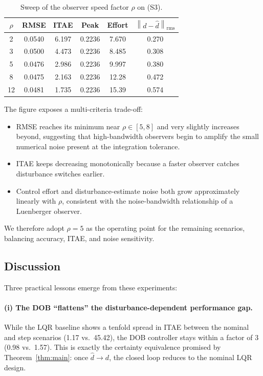 \documentclass[conference]{IEEEtran}
\newcommand{\norm}[1]{\left\lVert#1\right\rVert}
\begin{document}
\begin{table}[t]
  \centering
  \caption{Sweep of the observer speed factor $\rho$ on (S3).}
  \label{tab:sweep}
  \begin{tabular}{cccccc}
    \toprule
    $\rho$ & RMSE & ITAE & Peak & Effort & $\norm{\!d-\hat d\!}_{\!\mathrm{rms}}$\\
    \midrule
    2  & 0.0540 & 6.197 & 0.2236 & 7.670  & 0.270\\
    3  & 0.0500 & 4.473 & 0.2236 & 8.485  & 0.308\\
    5  & 0.0476 & 2.986 & 0.2236 & 9.997  & 0.380\\
    8  & 0.0475 & 2.163 & 0.2236 & 12.28  & 0.472\\
    12 & 0.0481 & 1.735 & 0.2236 & 15.39  & 0.574\\
    \bottomrule
  \end{tabular}
\end{table}

The figure exposes a multi-criteria trade-off:
\begin{itemize}\setlength\itemsep{2pt}
\item RMSE reaches its minimum near $\rho\!\in\![5,8]$ and very slightly
increases beyond, suggesting that high-bandwidth observers begin to amplify
the small numerical noise present at the integration tolerance.
\item ITAE keeps decreasing monotonically because a faster observer
catches disturbance switches earlier.
\item Control effort and disturbance-estimate noise both grow
approximately linearly with $\rho$, consistent with the noise-bandwidth
relationship of a Luenberger observer.
\end{itemize}

We therefore adopt $\rho=5$ as the operating point for the remaining
scenarios, balancing accuracy, ITAE, and noise sensitivity.

\subsection{Discussion}

Three practical lessons emerge from these experiments:

\paragraph*{(i) The DOB ``flattens'' the disturbance-dependent performance
gap.} While the LQR baseline shows a tenfold spread in ITAE between the
nominal and step scenarios (1.17 vs.\ 45.42), the DOB controller stays
within a factor of 3 (0.98 vs.\ 1.57). This is exactly the certainty
equivalence promised by Theorem~\ref{thm:main}: once $\hat d\to d$, the
closed loop reduces to the nominal LQR design.
\end{document}
